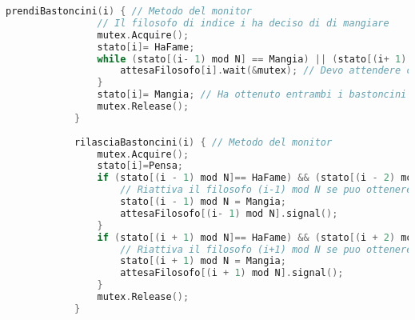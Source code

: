 \begin{example}
\begin{itemize}
\begin{lstlisting}[language=C]
			prendiBastoncini(i) { // Metodo del monitor
				// Il filosofo di indice i ha deciso di di mangiare
				mutex.Acquire();
				stato[i]= HaFame;
				while (stato[(i- 1) mod N] == Mangia) || (stato[(i+ 1) mod N] == Mangia ) {
					attesaFilosofo[i].wait(&mutex); // Devo attendere che siano liberi entrambi
				}
				stato[i]= Mangia; // Ha ottenuto entrambi i bastoncini
				mutex.Release();
			}
			
			rilasciaBastoncini(i) { // Metodo del monitor
				mutex.Acquire();
				stato[i]=Pensa; 
				if (stato[(i - 1) mod N]== HaFame) && (stato[(i - 2) mod N] != Mangia) {
					// Riattiva il filosofo (i-1) mod N se puo ottenere entrambi i bastoncini
					stato[(i - 1) mod N = Mangia; 
					attesaFilosofo[(i- 1) mod N].signal();
				}
				if (stato[(i + 1) mod N]== HaFame) && (stato[(i + 2) mod N] != Mangia) {
					// Riattiva il filosofo (i+1) mod N se puo ottenere entrambi i bastoncini
					stato[(i + 1) mod N = Mangia;
					attesaFilosofo[(i + 1) mod N].signal();
				}
				mutex.Release();
			}
		\end{lstlisting}
	\end{itemize}
\end{example}

